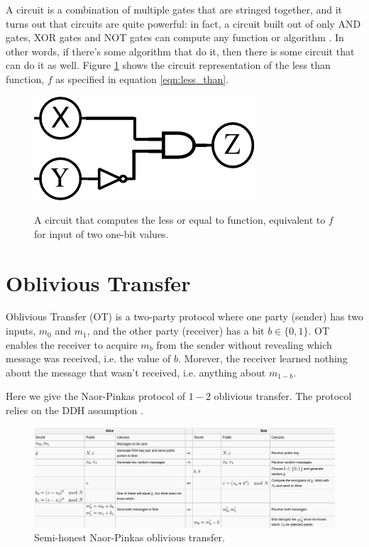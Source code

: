 A circuit is a combination of multiple gates that are stringed together, and it turns out that circuits are quite powerful: in fact, a circuit built out of only AND gates, XOR gates and NOT gates can compute any function or algorithm .
In other words, if there's some algorithm that do it, then there is some circuit that can do it as well.
Figure \ref{fig:less_than_circuit} shows the circuit representation of the less than function, $f$ as specified in equation \ref{eqn:less_than}.

\begin{figure}[h]
    \centering
    \includegraphics[scale=0.75]{images/drawing.png}
    \label{fig:less_than_circuit}
    \caption{A circuit that computes the less or equal to function, equivalent to $f$ for input of two one-bit values. }
\end{figure}

\section{Oblivious Transfer}
Oblivious Transfer (OT) is a two-party protocol where one party (sender) has two inputs, $m_0$ and $m_1$, and the other party (receiver) has a bit $b \in \{0,1\}$. 
OT enables the receiver to acquire $m_b$ from the sender without revealing which message was received, i.e. the value of $b$.
Morever, the receiver learned nothing about the message that wasn't received, i.e. anything about $m_{1-b}$.

Here we give the Naor-Pinkas protocol of $1-2$ oblivious transfer.
The protocol relies on the DDH assumption .

\begin{figure}
    \centering
    \includegraphics[scale=0.3]{images/ot_wiki}
    \caption{Semi-honest Naor-Pinkas oblivious transfer.}
\end{figure}

